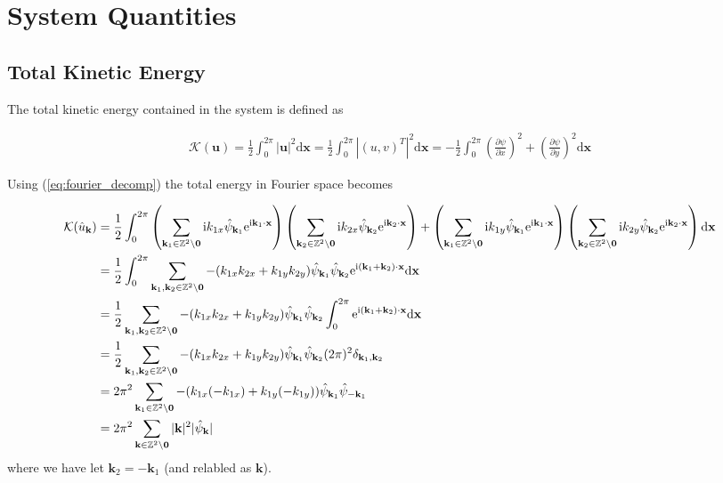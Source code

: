 \documentclass[9pt]{article}
\newcommand{\pder}[2]{\frac{\partial #1}{\partial #2}}               %
\newcommand{\psihat}[1]{\hat{\psi}_{#1}}      				          %
\newcommand{\ii}{\mathrm{i}}      								  %
\newcommand{\e}{\mathrm{e}}      								  %
\newcommand{\bfu}{\mathbf{u}}											%
\newcommand{\bfx}{\mathbf{x}}								%
\newcommand{\bfk}{\mathbf{k}}								%
\newcommand{\bfkn}[1]{\mathbf{k}_{#1}}								%
\begin{document}
\section{System Quantities}


\subsection{Total Kinetic Energy}

The total kinetic energy contained in the system is defined as 

\begin{align}
	\mathcal{K}(\bfu) = \frac{1}{2}\int_0^{2 \pi}|\bfu|^2\mathrm{d}\bfx = \frac{1}{2}\int_0^{2\pi} |(u, v)^{T}|^2 \mathrm{d}\bfx = -\frac{1}{2}\int_0^{2\pi} \left( \pder{\psi}{x}\right)^2 + \left( \pder{\psi}{y}\right)^2\mathrm{d}\bfx
\end{align}

Using (\ref{eq:fourier_decomp}) the total energy in Fourier space becomes

\begin{align}
\mathcal{K}(\hat{u}_{\bfk})	&= \frac{1}{2}\int_0^{2\pi} \left(\sum_{\mathbf{k}_1\in \mathbb{Z}^2\setminus \mathbf{0}}\ii k_{1x}\psihat{\bfkn{1}}\e^{\ii \mathbf{k}_1\cdot \mathbf{x}}\right)\left(\sum_{\mathbf{k}_2\in \mathbb{Z}^2\setminus \mathbf{0}}\ii k_{2x}\psihat{\bfkn{2}} \e^{\ii \mathbf{k}_2\cdot \mathbf{x}}\right) + \left(\sum_{\mathbf{k}_1\in \mathbb{Z}^2\setminus \mathbf{0}} \ii k_{1y}\psihat{\bfkn{1}}\e^{\ii \mathbf{k}_1\cdot \mathbf{x}}\right)\left(\sum_{\mathbf{k}_2\in \mathbb{Z}^2\setminus \mathbf{0}} \ii k_{2y} \psihat{\bfkn{2}}\e^{\ii \mathbf{k}_2\cdot \mathbf{x}}\right) \mathrm{d}\bfx \notag\\
	&= \frac{1}{2}\int_0^{2\pi} \sum_{\mathbf{k}_1, \mathbf{k}_2\in \mathbb{Z}^2\setminus \mathbf{0}} -(k_{1x}k_{2x} + k_{1y}k_{2y}) \psihat{\bfkn{1}}\psihat{\bfkn{2}} \e^{\ii (\mathbf{k}_1 + \mathbf{k}_2)\cdot \mathbf{x}} \mathrm{d}\bfx \notag \\
	&= \frac{1}{2}\sum_{\mathbf{k}_1, \mathbf{k}_2\in \mathbb{Z}^2\setminus \mathbf{0}} -(k_{1x}k_{2x} + k_{1y}k_{2y}) \psihat{\bfkn{1}}\psihat{\bfkn{2}} \int_0^{2\pi} \e^{\ii (\mathbf{k}_1 + \mathbf{k}_2)\cdot \mathbf{x}} \mathrm{d}\bfx \notag \\
	&= \frac{1}{2}\sum_{\mathbf{k}_1, \mathbf{k}_2\in \mathbb{Z}^2\setminus \mathbf{0}} -(k_{1x}k_{2x} + k_{1y}k_{2y}) \psihat{\bfkn{1}}\psihat{\bfkn{2}} (2\pi)^2 \delta_{\bfkn{1}, \bfkn{2}} \notag \\
	&= 2\pi^2 \sum_{\mathbf{k}_1\in \mathbb{Z}^2\setminus \mathbf{0}} -(k_{1x}(-k_{1x}) + k_{1y}(-k_{1y})) \psihat{\bfkn{1}}\psihat{-\bfkn{1}} \notag \\
	&= 2\pi^2 \sum_{\mathbf{k}\in \mathbb{Z}^2\setminus \mathbf{0}} |\bfk|^2 |\psihat{\bfk}|
	\label{eq:energy_u_fourier}
\end{align}
where we have let $\bfkn{2} = - \bfkn{1}$ (and relabled as $\bfk$).
\end{document}
